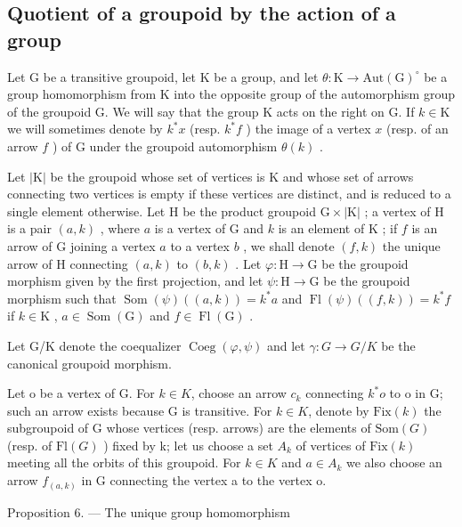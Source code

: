 \subsection{Quotient of a groupoid by the action of a group}

Let G be a transitive groupoid, let K be a group, and let \(\theta\colon\mathrm{K}\to\mathrm{Aut}(\mathrm{G})^{\circ}\) be a group homomorphism from K into the opposite group of the automorphism group of the groupoid G. We will say that the group K acts on the right on G. If \(k\in\mathrm{K}\) we will sometimes denote by \(k^{*}x\) (resp. \(k^{*}f\) ) the image of a vertex \(x\) (resp. of an arrow \(f\) ) of G under the groupoid automorphism \(\theta(k)\) .

Let \(|\mathrm{K}|\) be the groupoid whose set of vertices is \(\mathrm{K}\) and whose set of arrows connecting two vertices is empty if these vertices are distinct, and is reduced to a single element otherwise. Let \(\mathrm{H}\) be the product groupoid \(\mathrm{G} \times |\mathrm{K}|\) ; a vertex of \(\mathrm{H}\) is a pair \((a,k)\) , where \(a\) is a vertex of \(\mathrm{G}\) and \(k\) is an element of \(\mathrm{K}\) ; if \(f\) is an arrow of \(\mathrm{G}\) joining a vertex \(a\) to a vertex \(b\) , we shall denote \((f,k)\) the unique arrow of \(\mathrm{H}\) connecting \((a,k)\) to \((b,k)\) . Let \(\varphi: \mathrm{H} \to \mathrm{G}\) be the groupoid morphism given by the first projection, and let \(\psi: \mathrm{H} \to \mathrm{G}\) be the groupoid morphism such that \(\operatorname{Som}(\psi)((a,k)) = k^*a\) and \(\operatorname{Fl}(\psi)((f,k)) = k^*f\) if \(k \in \mathrm{K}\) , \(a \in \operatorname{Som}(\mathrm{G})\) and \(f \in \operatorname{Fl}(\mathrm{G})\) .

Let G/K denote the coequalizer \(\operatorname{Coeg}(\varphi,\psi)\) and let \(\gamma\colon G\to G/K\) be the canonical groupoid morphism.

Let o be a vertex of G. For \(k \in K\), choose an arrow \(c_{k}\) connecting \(k^{*}o\) to o in G; such an arrow exists because G is transitive. For \(k \in K\), denote by \(\text{Fix}(k)\) the subgroupoid of G whose vertices (resp. arrows) are the elements of \(\text{Som}(G)\) (resp. of \(\text{Fl}(G)\) ) fixed by k; let us choose a set \(A_{k}\) of vertices of \(\text{Fix}(k)\) meeting all the orbits of this groupoid. For \(k \in K\) and \(a \in A_{k}\) we also choose an arrow \(f_{(a,k)}\) in G connecting the vertex a to the vertex o.

Proposition 6. — The unique group homomorphism

